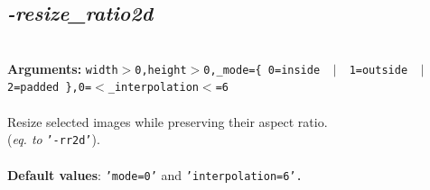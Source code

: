 \documentclass[a4paper,11pt,twoside]{book}
\begin{document}
\subsection{\emph{-resize\_ratio2d} }\vspace*{-0.5em}
~\\\textbf{Arguments: } 
{\small \texttt{width$>$0,height$>$0,\_mode=\{ 0=inside ~$|$~ 1=outside ~$|$~ 2=padded \},0=$<$\_interpolation$<$=6}}\\~\\
Resize selected images while preserving their aspect ratio.
~\\(\emph{eq. to} {\small \texttt{'-rr2d'}}).
~\\~\\\textbf{Default values}: {\small \texttt{'mode=0'} and \texttt{'interpolation=6'.}}
\end{document}
